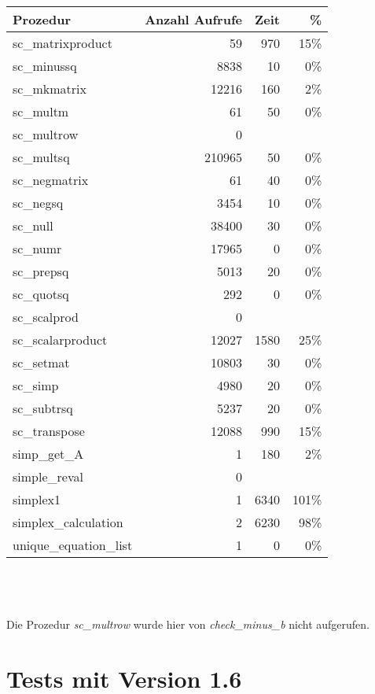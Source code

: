 \documentclass[a4paper]{article}
\begin{document}
\newpage

\begin{tabular}{lrrr}
Prozedur & Anzahl Aufrufe & Zeit & \% \\
\hline
sc\_matrixproduct & 59 & 970 & 15\% \\
sc\_minussq & 8838 & 10 & 0\% \\
sc\_mkmatrix & 12216 & 160 & 2\% \\
sc\_multm & 61 & 50 & 0\% \\
sc\_multrow & 0 &  &  \\
sc\_multsq & 210965 & 50 & 0\% \\
sc\_negmatrix & 61 & 40 & 0\% \\
sc\_negsq & 3454 & 10 & 0\% \\
sc\_null & 38400 & 30 & 0\% \\
sc\_numr & 17965 & 0 & 0\% \\
sc\_prepsq & 5013 & 20 & 0\% \\
sc\_quotsq & 292 & 0 & 0\% \\
sc\_scalprod & 0 &  &  \\
sc\_scalarproduct & 12027 & 1580 & 25\% \\
sc\_setmat & 10803 & 30 & 0\% \\
sc\_simp & 4980 & 20 & 0\% \\
sc\_subtrsq & 5237 & 20 & 0\% \\
sc\_transpose & 12088 & 990 & 15\% \\
simp\_get\_A & 1 & 180 & 2\% \\
simple\_reval & 0 &  &  \\
simplex1 & 1 & 6340 & 101\% \\
simplex\_calculation & 2 & 6230 & 98\% \\
unique\_equation\_list & 1 & 0 & 0\% \\
\end{tabular} \\
\\
\\
Die Prozedur \textit{sc\_multrow} wurde hier von \textit{check\_minus\_b} nicht aufgerufen.
\newpage

\section{Tests mit Version 1.6}
\end{document}
